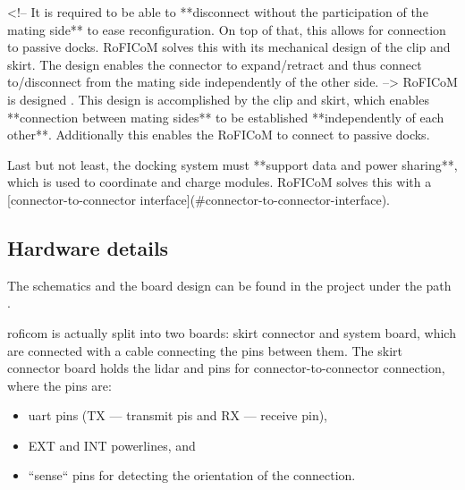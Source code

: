 \documentclass[
  digital,     %
  oneside,     %
  nosansbold,  %
  nocolorbold, %
  nolof,         %
  nolot,         %
]{fithesis4}
\newcommand{\TODO}[1]{\textcolor{red}{\textit{#1}}}
\newcommand{\TODOLIST}[1]{}
\begin{document}
{{{<!-- It is required to be able to **disconnect without the participation of the mating side** to ease reconfiguration. On top of
that, this allows for connection to passive docks. RoFICoM solves this with its mechanical design of the clip and skirt.
The design enables the connector to expand/retract and thus connect to/disconnect from the mating side independently
of the other side. -->
RoFICoM is designed . This design is accomplished by the clip and skirt, which enables **connection between mating sides** to be established **independently of each other**. Additionally this enables the RoFICoM to connect to passive docks.

Last but not least, the docking system must **support data and power
sharing**, which is used to coordinate and charge modules. RoFICoM solves this with a [connector-to-connector
interface](#connector-to-connector-interface).
\fi


\subsection{ Hardware details } \label{sec:roficom-hw}
\TODOLIST{
\begin{itemize}
    \item \acrshort{mcu}
    \item motor
    \item \acrshort{uart}
    \item \acrshort{spi}
    \item \acrshort{i2c}
    \item EXT and INT power lines
\end{itemize}
}

The schematics and the board design can be found in the project under the path .

\acrshort{roficom} is actually split into two boards: skirt connector and system board, which are connected with a cable connecting the pins between them. The skirt connector board holds the \acrshort{lidar} and pins for connector-to-connector connection, where the pins are: 

\begin{itemize}
    \item \acrshort{uart} pins (TX --- transmit pis and RX --- receive pin),
    \item EXT and INT powerlines, and
    \item ``sense`` pins for detecting the orientation of the connection.
\end{itemize}

}}}
\end{document}
